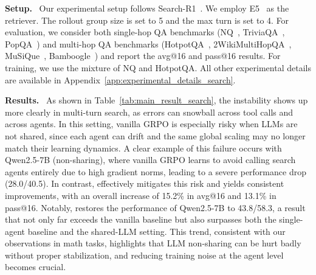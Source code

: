 \textbf{Setup.}~
Our experimental setup follows Search-R1~\citep{jin2025search}. We employ E5~\citep{wang2022text} as the retriever. The rollout group size is set to 5 and the max turn is set to 4. For evaluation, we consider both single-hop QA benchmarks (NQ~\citep{kwiatkowski2019natural}, TriviaQA~\citep{joshi2017triviaqa}, PopQA~\citep{mallen2022not}) and multi-hop QA benchmarks (HotpotQA~\citep{yang2018hotpotqa}, 2WikiMultiHopQA~\citep{ho2020constructing}, MuSiQue~\citep{trivedi2022musique}, Bamboogle~\citep{press2022measuring}) and report the avg@16 and pass@16 results. For training, we use the mixture of NQ and HotpotQA. All other experimental details are available in Appendix~\ref{app:experimental_details_search}.


\textbf{Results.}~
As shown in Table~\ref{tab:main_result_search}, the instability shows up more clearly in multi-turn search, as errors can snowball across tool calls and across agents. In this setting, vanilla GRPO is especially risky when LLMs are not shared, since each agent can drift and the same global scaling may no longer match their learning dynamics. A clear example of this failure occurs with Qwen2.5-7B (non-sharing), where vanilla GRPO learns to avoid calling search agents entirely due to high gradient norms, leading to a severe performance drop (28.0/40.5). In contrast, \methodname{} effectively mitigates this risk and yields consistent improvements, with an overall increase of 15.2\% in avg@16 and 13.1\% in pass@16. Notably, \methodname{} restores the performance of Qwen2.5-7B to 43.8/58.3, a result that not only far exceeds the vanilla baseline but also surpasses both the single-agent baseline and the shared-LLM setting. This trend, consistent with our observations in math tasks, highlights that LLM non-sharing can be hurt badly without proper stabilization, and reducing training noise at the agent level becomes crucial.


